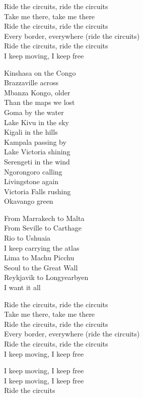 \begin{lyrics}
Ride the circuits, ride the circuits\\
Take me there, take me there\\
Ride the circuits, ride the circuits\\
Every border, everywhere
(ride the circuits)\\
Ride the circuits, ride the circuits\\
I keep moving, I keep free

Kinshasa on the Congo\\
Brazzaville across\\
Mbanza Kongo, older\\
Than the maps we lost\\
Goma by the water\\
Lake Kivu in the sky\\
Kigali in the hills\\
Kampala passing by\\
Lake Victoria shining\\
Serengeti in the wind\\
Ngorongoro calling\\
Livingstone again\\
Victoria Falls rushing\\
Okavango green

From Marrakech to Malta\\
From Seville to Carthage\\
Rio to Ushuaia\\
I keep carrying the atlas\\
Lima to Machu Picchu\\
Seoul to the Great Wall\\
Reykjavik to Longyearbyen\\
I want it all

Ride the circuits, ride the circuits\\
Take me there, take me there\\
Ride the circuits, ride the circuits\\
Every border, everywhere
(ride the circuits)\\
Ride the circuits, ride the circuits\\
I keep moving, I keep free

I keep moving, I keep free\\
I keep moving, I keep free\\
Ride the circuits
\end{lyrics}

